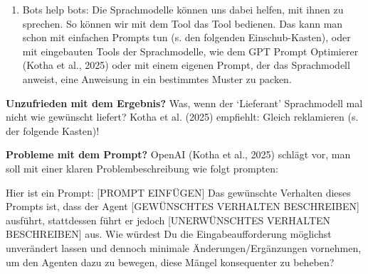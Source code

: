 \documentclass[
  ngerman,
  letterpaper,
  DIV=11]{scrreprt}
\providecommand{\tightlist}{%
  \setlength{\itemsep}{0pt}\setlength{\parskip}{0pt}}
\begin{document}
\begin{enumerate}
  \begin{enumerate}
  \def\labelenumii{\Alph{enumii}.}
  \setcounter{enumii}{1}
  \tightlist
  \item
    als `Eagerness-Kalibrierung' einstellen (Kotha et al., 2025). Bei
    solchen mehrstufigen, längeren Prozessen müssen wir auch über das
    `Gedächtnis' des Agenten-Bots nachdenken. Im Detail wird hier etwa
    empfohlen, den Agenten seine Zwischenergebnisse (`states') in hoch
    strukturierter Form ablegen zu lassen (im JSON-Format etwa, das
    sozusagen markierte Schubladen für die Daten bereitstellt) und kurze
    nummerierte Zwischennotizen im Fließtext zu erfragen („Im letzten
    Schritt habe ich folgende Updates an dem Text vorgenommen\ldots``)
    (Anthropic, 2025a). Wir sehen, dass hier die Empfehlungen schon
    stärker in Richtung der Führung von Mitarbeitern gehen, eine
    Konsequenz der wachsenden Selbstständigkeit dieser `cybernetic
    teammates' (Dell'Acqua et al., 2025).
  \end{enumerate}
\item
  Bots help bots: Die Sprachmodelle können uns dabei helfen, mit ihnen
  zu sprechen. So können wir mit dem Tool das Tool bedienen. Das kann
  man schon mit einfachen Prompts tun (s. den folgenden
  Einschub-Kasten), oder mit eingebauten Tools der Sprachmodelle, wie
  dem GPT Prompt Optimierer (Kotha et al., 2025) oder mit einem eigenen
  Prompt, der das Sprachmodell anweist, eine Anweisung in ein bestimmtes
  Muster zu packen.
\end{enumerate}

\textbf{Unzufrieden mit dem Ergebnis?} Was, wenn der `Lieferant'
Sprachmodell mal nicht wie gewünscht liefert? Kotha et al. (2025)
empfiehlt: Gleich reklamieren (s. der folgende Kasten)!

\begin{tcolorbox}[enhanced jigsaw, left=2mm, bottomrule=.15mm, arc=.35mm, rightrule=.15mm, colframe=quarto-callout-tip-color-frame, coltitle=black, colback=white, toprule=.15mm, toptitle=1mm, colbacktitle=quarto-callout-tip-color!10!white, title=\textcolor{quarto-callout-tip-color}{\faLightbulb}\hspace{0.5em}{Meta-Prompts: Den Bot den Prompt verbessern lassen}, opacitybacktitle=0.6, leftrule=.75mm, bottomtitle=1mm, titlerule=0mm, opacityback=0, breakable]

\textbf{Probleme mit dem Prompt?} OpenAI (Kotha et al., 2025) schlägt
vor, man soll mit einer klaren Problembeschreibung wie folgt prompten:

Hier ist ein Prompt: {[}PROMPT EINFÜGEN{]} Das gewünschte Verhalten
dieses Prompts ist, dass der Agent {[}GEWÜNSCHTES VERHALTEN
BESCHREIBEN{]} ausführt, stattdessen führt er jedoch {[}UNERWÜNSCHTES
VERHALTEN BESCHREIBEN{]} aus. Wie würdest Du die Eingabeaufforderung
möglichst unverändert lassen und dennoch minimale Änderungen/Ergänzungen
vornehmen, um den Agenten dazu zu bewegen, diese Mängel konsequenter zu
beheben?

\end{tcolorbox}
\end{document}
